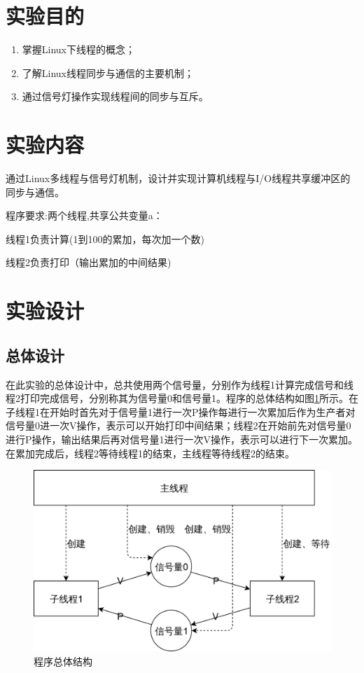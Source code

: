 \documentclass{report}
\begin{document}
\section{实验目的}
\label{sec:shi_yan_mu_de_2}

\begin{enumerate}
    \item 掌握Linux下线程的概念；
    \item 了解Linux线程同步与通信的主要机制；
    \item 通过信号灯操作实现线程间的同步与互斥。
\end{enumerate}

\section{实验内容}
\label{sec:shi_yan_nei_rong_2}
通过Linux多线程与信号灯机制，设计并实现计算机线程与I/O线程共享缓冲区的同步与通信。\par
程序要求:两个线程,共享公共变量a：\par
\hspace{4em}线程1负责计算(1到100的累加，每次加一个数)\par
\hspace{4em}线程2负责打印（输出累加的中间结果)\par

\section{实验设计}
\label{sec:shi_yan_she_ji_2}

\subsection{总体设计}
\label{sub:zong_ti_she_ji_2}
在此实验的总体设计中，总共使用两个信号量，分别作为线程1计算完成信号和线程2打印完成信号，分别称其为信号量0和信号量1。程序的总体结构如图\ref{fig:exp2Structure}所示。在子线程1在开始时首先对于信号量1进行一次P操作每进行一次累加后作为生产者对信号量0进一次V操作，表示可以开始打印中间结果；线程2在开始前先对信号量0进行P操作，输出结果后再对信号量1进行一次V操作，表示可以进行下一次累加。在累加完成后，线程2等待线程1的结束，主线程等待线程2的结束。

\begin{figure}[ht]
    \centering
    \includegraphics[width=0.6\linewidth]{exp2Structure.png}
    \caption{程序总体结构}
    \label{fig:exp2Structure}
\end{figure}
\end{document}
